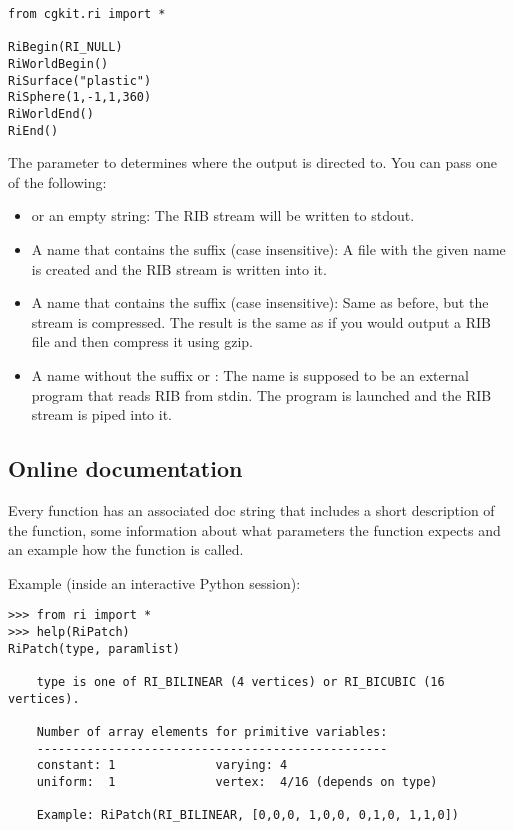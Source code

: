 \begin{verbatim}
from cgkit.ri import *

RiBegin(RI_NULL)
RiWorldBegin()
RiSurface("plastic")
RiSphere(1,-1,1,360)
RiWorldEnd()
RiEnd()
\end{verbatim}

The parameter to  determines where the output is
directed to. You can pass one of the following:

\begin{itemize}
\item {} or an empty string: The RIB stream will be written to 
stdout. 
\item A name that contains the suffix  (case insensitive): 
A file with the given name is created and the RIB stream is written into it. 
\item A name that contains the suffix  (case insensitive):
Same as before, but the stream is compressed. The result is the same as if you
would output a RIB file and then compress it using gzip.  
\item A name without the suffix  or : The name
is supposed to be an external program that reads RIB from stdin. 
The program is launched and the RIB stream is piped into it.
\end{itemize}

\subsection{Online documentation}

Every function has an associated doc string that includes a short
description of the function, some information about what parameters
the function expects and an example how the function is called.

Example (inside an interactive Python session):

\begin{verbatim}
>>> from ri import *
>>> help(RiPatch)
RiPatch(type, paramlist)

    type is one of RI_BILINEAR (4 vertices) or RI_BICUBIC (16 vertices).

    Number of array elements for primitive variables:
    -------------------------------------------------
    constant: 1              varying: 4
    uniform:  1              vertex:  4/16 (depends on type)

    Example: RiPatch(RI_BILINEAR, [0,0,0, 1,0,0, 0,1,0, 1,1,0])
\end{verbatim}

